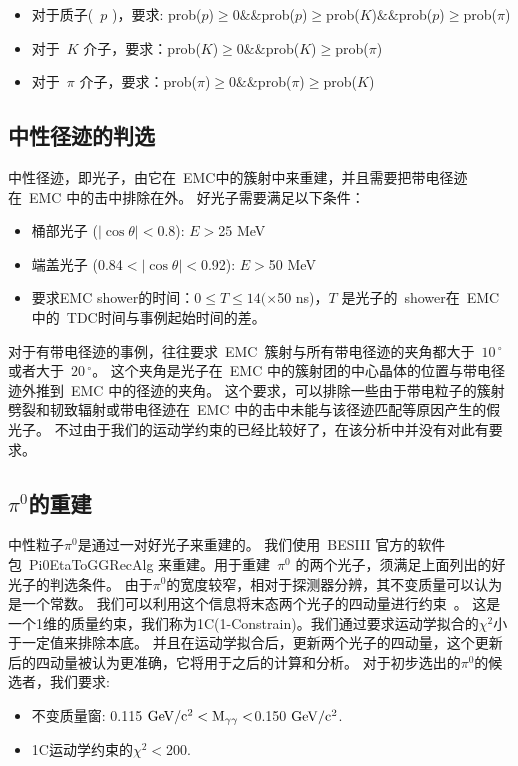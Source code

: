 \begin{itemize}
\item 对于质子(~$p$ )，要求: prob($p$)$\geqslant$0$\&\&$prob($p$)$\geqslant$prob($K$)$\mathcal{\&\&}$prob($p$)$\geqslant$prob($\pi$)
\item 对于~$K$ 介子，要求：prob($K$)$\geqslant$0$\mathcal{\&\&}$prob($K$)$\geqslant$prob($\pi$)
\item 对于~$\pi$ 介子，要求：prob($\pi$)$\geqslant$0$\mathcal{\&\&}$prob($\pi$)$\geqslant$prob($K$)
\end{itemize}

\subsection{中性径迹的判选}
中性径迹，即光子，由它在~EMC中的簇射中来重建，并且需要把带电径迹在~EMC 中的击中排除在外。 好光子需要满足以下条件：
\begin{itemize}
  \item 桶部光子 ($|\cos\theta|<$\rm 0.8): $E>$25 MeV
  \item 端盖光子 (0.84$<|\cos\theta|<$\rm 0.92): $E>$50 MeV
  \item 要求EMC shower的时间：$0\leq T\leq 14(\times$50 ns)，$T$ 是光子的~shower在~EMC 中的~TDC时间与事例起始时间的差。
\end{itemize}

对于有带电径迹的事例，往往要求~EMC~簇射与所有带电径迹的夹角都大于~$10\,^{\circ}$或者大于~$20\,^{\circ}$。
这个夹角是光子在~EMC 中的簇射团的中心晶体的位置与带电径迹外推到~EMC 中的径迹的夹角。
这个要求，可以排除一些由于带电粒子的簇射劈裂和韧致辐射或带电径迹在~EMC 中的击中未能与该径迹匹配等原因产生的假光子。
不过由于我们的运动学约束的已经比较好了，在该分析中并没有对此有要求。

\subsection{$\pi^{0}$的重建}
中性粒子$\pi^{0}$是通过一对好光子来重建的。
我们使用~BESIII 官方的软件包~Pi0EtaToGGRecAlg 来重建。用于重建~$\pi^{0}$ 的两个光子，须满足上面列出的好光子的判选条件。
由于$\pi^{0}$的宽度较窄，相对于探测器分辨，其不变质量可以认为是一个常数。
我们可以利用这个信息将末态两个光子的四动量进行约束~\cite{Kmfit}。
这是一个1维的质量约束，我们称为1C(1-Constrain)。我们通过要求运动学拟合的$\chi^{2}$小于一定值来排除本底。
并且在运动学拟合后，更新两个光子的四动量，这个更新后的四动量被认为更准确，它将用于之后的计算和分析。
对于初步选出的$\pi^{0}$的候选者，我们要求:
\begin{itemize}
\item 不变质量窗: 0.115 $\rm GeV/c^{2}<M_{\gamma\gamma}<$0.150 $\rm GeV/c^{2}$.
\item 1C运动学约束的$\chi^{2}<$200.
\end{itemize}

